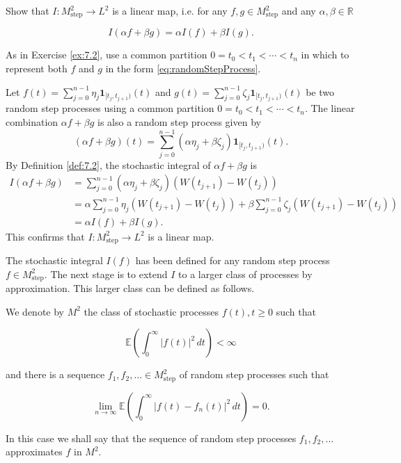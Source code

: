 \begin{Exercise}
\label{ex:7.3}
Show that $I: M_{\mathrm{step}}^2 \to L^2$ is a linear map, i.e. for any $f, g \in M_{\mathrm{step}}^2$ and any $\alpha, \beta \in \mathbb{R}$

\begin{equation}
I(\alpha f + \beta g) = \alpha I(f) + \beta I(g).
\end{equation}

\begin{hint}
As in Exercise \ref{ex:7.2}, use a common partition $0 = t_0 < t_1 < \cdots < t_n$ in which to represent both $f$ and $g$ in the form \eqref{eq:randomStepProcess}.
\end{hint}
\end{Exercise}

\begin{Solution}
Let $f(t) = \sum_{j=0}^{n-1} \eta_j \mathbf{1}_{[t_j, t_{j+1})}(t)$ and $g(t) = \sum_{j=0}^{n-1} \zeta_j \mathbf{1}_{[t_j, t_{j+1})}(t)$ be two random step processes using a common partition $0 = t_0 < t_1 < \cdots < t_n$. The linear combination $\alpha f + \beta g$ is also a random step process given by
\begin{equation*}
(\alpha f + \beta g)(t) = \sum_{j=0}^{n-1} (\alpha \eta_j + \beta \zeta_j) \mathbf{1}_{[t_j, t_{j+1})}(t).
\end{equation*}
By Definition \ref{def:7.2}, the stochastic integral of $\alpha f + \beta g$ is
\begin{align*}
I(\alpha f + \beta g) &= \sum_{j=0}^{n-1} (\alpha \eta_j + \beta \zeta_j) (W(t_{j+1}) - W(t_j)) \\
&= \alpha \sum_{j=0}^{n-1} \eta_j (W(t_{j+1}) - W(t_j)) + \beta \sum_{j=0}^{n-1} \zeta_j (W(t_{j+1}) - W(t_j)) \\
&= \alpha I(f) + \beta I(g).
\end{align*}
This confirms that $I: M_{\mathrm{step}}^2 \to L^2$ is a linear map.
\end{Solution}


The stochastic integral $I(f)$ has been defined for any random step process $f \in M_{\mathrm{step}}^2$. The next stage is to extend $I$ to a larger class of processes by approximation. This larger class can be defined as follows.

\begin{Definition}
\label{def:7.3}
We denote by $M^2$ the class of stochastic processes $f(t), t \geq 0$ such that

\begin{equation}
\mathbb{E}\left(\int_0^\infty |f(t)|^2 \, dt\right) < \infty
\end{equation}

and there is a sequence $f_1, f_2, \ldots \in M_{\mathrm{step}}^2$ of random step processes such that

\begin{equation}
\lim_{n \to \infty} \mathbb{E}\left(\int_0^\infty |f(t) - f_n(t)|^2 \, dt\right) = 0.
\label{eq:M2approximation}
\end{equation}

In this case we shall say that the sequence of random step processes $f_1, f_2, \ldots$ approximates $f$ in $M^2$.
\end{Definition}

